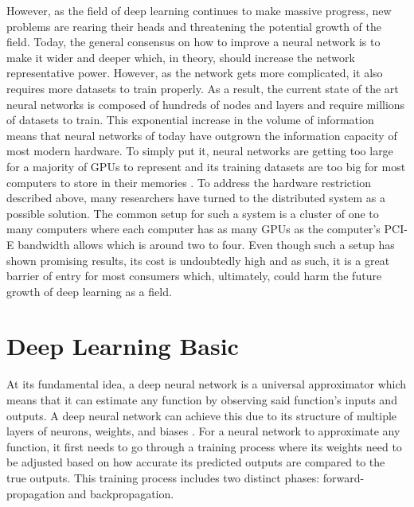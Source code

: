 \documentclass[conference]{IEEEtran}
\begin{document}
        However, as the field of deep learning continues to make massive progress, new problems are rearing their heads and threatening the potential growth of the field. Today, the general consensus on how to improve a neural network is to make it wider and deeper which, in theory, should increase the network representative power. However, as the network gets more complicated, it also requires more datasets to train properly. As a result, the current state of the art neural networks is composed of hundreds of nodes and layers and require millions of datasets to train. This exponential increase in the volume of information means that neural networks of today have outgrown the information capacity of most modern hardware. To simply put it, neural networks are getting too large for a majority of GPUs to represent and its training datasets are too big for most computers to store in their memories \cite{ben-nun_hoefler_2019}. To address the hardware restriction described above, many researchers have turned to the distributed system as a possible solution. The common setup for such a system is a cluster of one to many computers where each computer has as many GPUs as the computer's PCI-E bandwidth allows which is around two to four.  Even though such a setup has shown promising results, its cost is undoubtedly high and as such, it is a great barrier of entry for most consumers which, ultimately, could harm the future growth of deep learning as a field.
        
    \section{Deep Learning Basic}
        At its fundamental idea, a deep neural network is a universal approximator which means that it can estimate any function by observing said function's inputs and outputs. A deep neural network can achieve this due to its structure of multiple layers of neurons, weights, and biases \cite{hornik_1991}. For a neural network to approximate any function, it first needs to go through a training process where its weights need to be adjusted based on how accurate its predicted outputs are compared to the true outputs. This training process includes two distinct phases: forward-propagation and backpropagation. 
\end{document}
